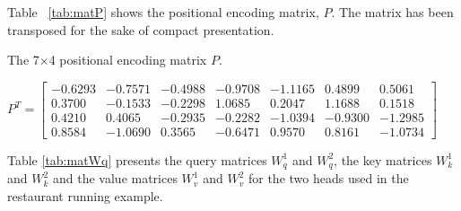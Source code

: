 \documentclass[algorithms,article,submit,pdftex,moreauthors]{Definitions/mdpi}
\begin{document}
\noindent Table ~\ref{tab:matP} shows the positional encoding matrix, $P$. The matrix has been transposed for the sake of compact presentation.

\begin{table}[ht]
	\centering
	\caption{The 7$\times$4 positional encoding matrix $P$.}
	\label{tab:matP}
	$
	P^T = \begin{bmatrix}
 	   -0.6293 & -0.7571 & -0.4988 & -0.9708 & -1.1165 &  0.4899 &  0.5061 \\
		0.3700 & -0.1533 & -0.2298 &  1.0685 &  0.2047 &  1.1688 &  0.1518 \\
		0.4210 &  0.4065 & -0.2935 & -0.2282 & -1.0394 & -0.9300 & -1.2985 \\
		0.8584 & -1.0690 &  0.3565 & -0.6471 &  0.9570 &  0.8161 & -1.0734
	\end{bmatrix}
	$
\end{table}

\noindent Table \ref{tab:matWq} presents the query matrices $W^1_q$ and $W^2_q$, the key matrices $W^1_k$ and $W^2_k$ and the value matrices $W^1_v$ and $W^2_v$ for the two heads used in the restaurant running example.
\end{document}
